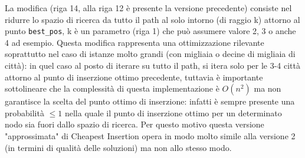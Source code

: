 \documentclass[a4paper,12pt]{report}
\begin{document}
La modifica (riga 14, alla riga 12 è presente la versione precedente) consiste nel ridurre lo spazio di ricerca da tutto il path al solo intorno (di raggio k) attorno al punto \lstinline!best_pos!, k è un parametro (riga 1) che può assumere valore 2, 3 o anche 4 ad esempio. Questa modifica rappresenta una ottimizzazione rilevante soprattutto nel caso di istanze molto grandi (con migliaia o decine di migliaia di città): in quel caso al posto di iterare su tutto il path, si itera solo per le 3-4 città attorno al punto di inserzione ottimo precedente, tuttavia è importante sottolineare che la complessità di questa implementazione è $O(n^2)$ ma non garantisce la scelta del punto ottimo di inserzione: infatti è sempre presente una probabilità $\leq 1$ nella quale il punto di inserzione ottimo per un determinato nodo sia fuori dallo spazio di ricerca. Per questo motivo questa versione "approssimata" di Cheapest Insertion opera in modo molto simile alla versione 2 (in termini di qualità delle soluzioni) ma non allo stesso modo.
\end{document}
